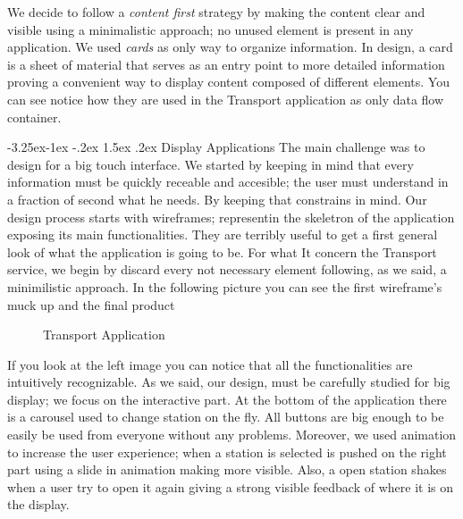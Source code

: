 \documentclass[]{usiinfbachelorproject}
\makeatletter
\newcommand\subsubsection{\@startsection{subsubsection}{3}{\z@}%
                {-3.25ex\@plus -1ex \@minus -.2ex}%
                {1.5ex \@plus .2ex}%
                {\normalfont\normalsize\bfseries}}
\makeatother
\begin{document}
We decide to follow a \emph{content first} strategy by making the content clear and visible using a minimalistic approach; no unused element is present in any application. We used \emph{cards} as only way to organize information. In design, a card is a sheet of material that serves as an entry point to more detailed information proving a convenient way to display content composed of different elements.
You can see notice how they are used in the Transport application as only data flow container.

\subsubsection{Display Applications}
The main challenge was to design for a big touch interface. We started by keeping in mind that every information must be quickly receable and accesible; the user must understand in a fraction of second what he needs. By keeping that constrains in mind.
Our design process starts with wireframes; representin the skeletron of the application exposing its main functionalities. They are terribly useful to get a first general look of what the application is going to be. For what It concern the Transport service, we begin by discard every not necessary element following, as we said, a minimilistic approach. In the following picture you can see the first wireframe's muck up and the final product
\begin{figure}[H]
  \centering
  \hfill
  \caption{Transport Application}
\end{figure} 
If you look at the left image you can notice that all the functionalities are intuitively recognizable. As we said, our design, must be carefully studied for big display; we focus on the interactive part.
At the bottom of the application there is a carousel used to change station on the fly. All buttons are big enough to be easily be used from everyone without any problems.
Moreover, we used animation to increase the user experience; when a station is selected is pushed on the right part using a slide in animation making more visible. Also, a open station shakes when a user try to open it again giving a strong visible feedback of where it is on the display. 
\end{document}
